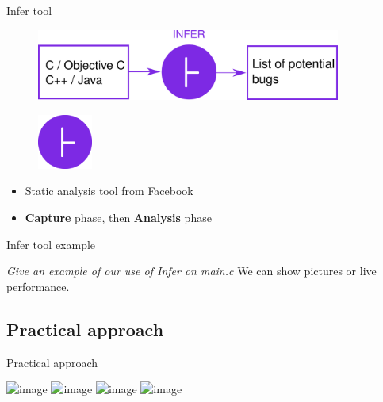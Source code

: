\documentclass{beamer}
\begin{document}
\begin{frame}{Infer tool}

\begin{figure}
\includegraphics[width=10cm]{Figures/InferDrawing.png}
\end{figure}

\end{frame}

\begin{frame}

\begin{figure}
\includegraphics[width = 1.8cm]{Figures/InferLogo.png}

\end{figure}

\vspace{1cm}

\begin{itemize}
\item Static analysis tool from Facebook
\item \textbf{Capture} phase, then \textbf{Analysis} phase
\end{itemize}

\end{frame}

\begin{frame}{Infer tool example}

\textit{Give an example of our use of Infer on main.c}
We can show pictures or live performance.
\end{frame}

\subsection{Practical approach}



\begin{frame}{Practical approach}

\includegraphics<1>[scale=0.3]{Figures/Workflow/1.png}
\includegraphics<2>[scale=0.3]{Figures/Workflow/2.png}
\includegraphics<3>[scale=0.3]{Figures/Workflow/3.png}
\includegraphics<4>[scale=0.3]{Figures/Workflow/4.png}

\end{frame}
\end{document}

